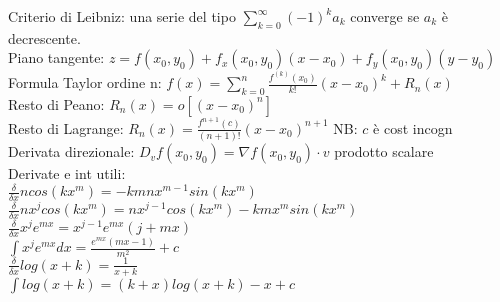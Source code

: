 \documentclass[10pt,landscape, a4paper]{article}
\begin{document}
\begin{multicols}{3}
Criterio di Leibniz:
una serie del tipo $\sum_{k=0}^{\infty} (-1)^k a_k$ converge se $a_k$ è decrescente.\\
Piano tangente: $z=f(x_0,y_0) + f_x(x_0,y_0)(x-x_0)+f_y(x_0,y_0)(y-y_0)$\\
Formula Taylor ordine n: $f(x)=\sum_{k=0}^{n}\frac{f^{(k)}(x_0)}{k!}(x-x_0)^k+R_n(x)$\\
Resto di Peano: $R_n(x) = o[(x-x_0)^n]$\\
Resto di Lagrange: $R_n(x)=\frac{f^{n+1}(c)}{(n+1)!}(x-x_0)^{n+1}$ NB: $c$ è cost incogn\\
Derivata direzionale: $D_vf(x_0,y_0)=\nabla f(x_0,y_0)\cdot v$ prodotto scalare\\
Derivate e int utili:\\
$\frac{\delta}{\delta x} n cos(kx^m) = -k m n x^{m-1} sin(kx^m)$\\
$\frac{\delta}{\delta x} nx^jcos(kx^m) = n x^{j-1} cos(kx^m) - k m x^m sin(kx^m)$\\
$\frac{\delta}{\delta x} x^j e^{mx} = x^{j-1} e^{mx} (j+mx)$\\
$\int x^j e^{mx} dx = \frac{e^{mx}(mx-1)}{m^2}+c$\\
$\frac{\delta}{\delta x} log(x+k) = \frac{1}{x+k}$\\
$\int log(x+k) = (k+x)log(x+k)-x+c$\\

\newpage




\end{multicols}
\end{document}
